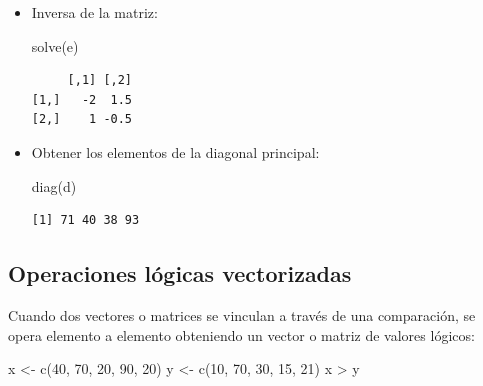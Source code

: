 \documentclass[
]{book}
\newenvironment{Shaded}{\begin{snugshade}}{\end{snugshade}}
\newcommand{\DecValTok}[1]{\textcolor[rgb]{0.00,0.00,0.81}{#1}}
\newcommand{\FunctionTok}[1]{\textcolor[rgb]{0.00,0.00,0.00}{#1}}
\newcommand{\NormalTok}[1]{#1}
\newcommand{\OtherTok}[1]{\textcolor[rgb]{0.56,0.35,0.01}{#1}}
\newcommand{\SpecialCharTok}[1]{\textcolor[rgb]{0.00,0.00,0.00}{#1}}
\begin{document}
\begin{itemize}
\begin{verbatim}
     [,1] [,2]
[1,]    9   23
[2,]   14   36
[3,]    4   10
\end{verbatim}
\item
  Inversa de la matriz:

\begin{Shaded}
\begin{Highlighting}[]
\FunctionTok{solve}\NormalTok{(e)}
\end{Highlighting}
\end{Shaded}

\begin{verbatim}
     [,1] [,2]
[1,]   -2  1.5
[2,]    1 -0.5
\end{verbatim}
\item
  Obtener los elementos de la diagonal principal:

\begin{Shaded}
\begin{Highlighting}[]
\FunctionTok{diag}\NormalTok{(d)}
\end{Highlighting}
\end{Shaded}

\begin{verbatim}
[1] 71 40 38 93
\end{verbatim}
\end{itemize}

\hypertarget{operaciones-luxf3gicas-vectorizadas}{%
\subsection{Operaciones lógicas vectorizadas}\label{operaciones-luxf3gicas-vectorizadas}}

Cuando dos vectores o matrices se vinculan a través de una comparación, se opera elemento a elemento obteniendo un vector o matriz de valores lógicos:

\begin{Shaded}
\begin{Highlighting}[]
\NormalTok{x }\OtherTok{\textless{}{-}} \FunctionTok{c}\NormalTok{(}\DecValTok{40}\NormalTok{, }\DecValTok{70}\NormalTok{, }\DecValTok{20}\NormalTok{, }\DecValTok{90}\NormalTok{, }\DecValTok{20}\NormalTok{)}
\NormalTok{y }\OtherTok{\textless{}{-}} \FunctionTok{c}\NormalTok{(}\DecValTok{10}\NormalTok{, }\DecValTok{70}\NormalTok{, }\DecValTok{30}\NormalTok{, }\DecValTok{15}\NormalTok{, }\DecValTok{21}\NormalTok{)}
\NormalTok{x }\SpecialCharTok{\textgreater{}}\NormalTok{ y}
\end{Highlighting}
\end{Shaded}
\end{document}
